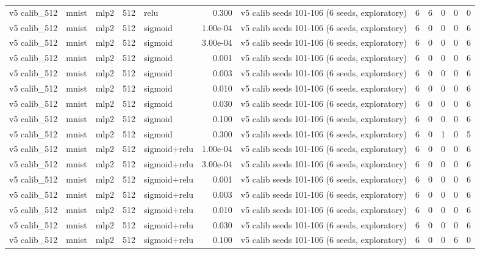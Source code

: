 \begin{table}[htbp]
{\begin{tabular}{@{}lllrlrlrrrrr@{}}
v5 calib\_512 & mnist & mlp2 & 512 & relu & 0.300 & v5 calib seeds 101-106 (6 seeds, exploratory) & 6 & 6 & 0 & 0 & 0 \\
v5 calib\_512 & mnist & mlp2 & 512 & sigmoid & 1.00e-04 & v5 calib seeds 101-106 (6 seeds, exploratory) & 6 & 0 & 0 & 0 & 6 \\
v5 calib\_512 & mnist & mlp2 & 512 & sigmoid & 3.00e-04 & v5 calib seeds 101-106 (6 seeds, exploratory) & 6 & 0 & 0 & 0 & 6 \\
v5 calib\_512 & mnist & mlp2 & 512 & sigmoid & 0.001 & v5 calib seeds 101-106 (6 seeds, exploratory) & 6 & 0 & 0 & 0 & 6 \\
v5 calib\_512 & mnist & mlp2 & 512 & sigmoid & 0.003 & v5 calib seeds 101-106 (6 seeds, exploratory) & 6 & 0 & 0 & 0 & 6 \\
v5 calib\_512 & mnist & mlp2 & 512 & sigmoid & 0.010 & v5 calib seeds 101-106 (6 seeds, exploratory) & 6 & 0 & 0 & 0 & 6 \\
v5 calib\_512 & mnist & mlp2 & 512 & sigmoid & 0.030 & v5 calib seeds 101-106 (6 seeds, exploratory) & 6 & 0 & 0 & 0 & 6 \\
v5 calib\_512 & mnist & mlp2 & 512 & sigmoid & 0.100 & v5 calib seeds 101-106 (6 seeds, exploratory) & 6 & 0 & 0 & 0 & 6 \\
v5 calib\_512 & mnist & mlp2 & 512 & sigmoid & 0.300 & v5 calib seeds 101-106 (6 seeds, exploratory) & 6 & 0 & 1 & 0 & 5 \\
v5 calib\_512 & mnist & mlp2 & 512 & sigmoid+relu & 1.00e-04 & v5 calib seeds 101-106 (6 seeds, exploratory) & 6 & 0 & 0 & 0 & 6 \\
v5 calib\_512 & mnist & mlp2 & 512 & sigmoid+relu & 3.00e-04 & v5 calib seeds 101-106 (6 seeds, exploratory) & 6 & 0 & 0 & 0 & 6 \\
v5 calib\_512 & mnist & mlp2 & 512 & sigmoid+relu & 0.001 & v5 calib seeds 101-106 (6 seeds, exploratory) & 6 & 0 & 0 & 0 & 6 \\
v5 calib\_512 & mnist & mlp2 & 512 & sigmoid+relu & 0.003 & v5 calib seeds 101-106 (6 seeds, exploratory) & 6 & 0 & 0 & 0 & 6 \\
v5 calib\_512 & mnist & mlp2 & 512 & sigmoid+relu & 0.010 & v5 calib seeds 101-106 (6 seeds, exploratory) & 6 & 0 & 0 & 0 & 6 \\
v5 calib\_512 & mnist & mlp2 & 512 & sigmoid+relu & 0.030 & v5 calib seeds 101-106 (6 seeds, exploratory) & 6 & 0 & 0 & 0 & 6 \\
v5 calib\_512 & mnist & mlp2 & 512 & sigmoid+relu & 0.100 & v5 calib seeds 101-106 (6 seeds, exploratory) & 6 & 0 & 0 & 6 & 0 \\

\end{tabular}}
\end{table}
